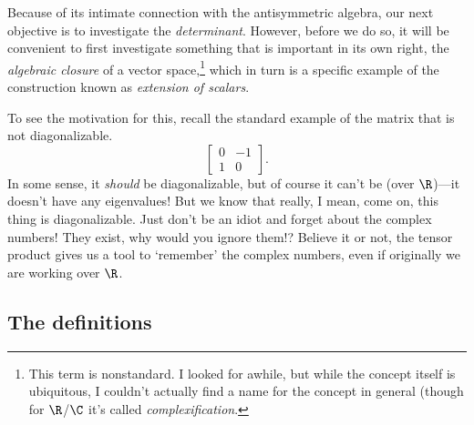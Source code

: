 Because of its intimate connection with the antisymmetric algebra, our next objective is to investigate the \emph{determinant}.  However, before we do so, it will be convenient to first investigate something that is important in its own right, the \emph{algebraic closure} of a vector space,\footnote{This term is nonstandard.  I looked for awhile, but while the concept itself is ubiquitous, I couldn't actually find a name for the concept in general (though for $\R$/$\C$ it's called \emph{complexification}.} which in turn is a specific example of the construction known as \emph{extension of scalars}.

To see the motivation for this, recall the standard example of the matrix that is not diagonalizable.
\begin{equation}
	\begin{bmatrix}0 & -1 \\ 1 & 0\end{bmatrix}.
\end{equation}
In some sense, it \emph{should} be diagonalizable, but of course it can't be (over $\R$)---it doesn't have any eigenvalues!  But we know that really, I mean, come on, this thing is diagonalizable.  Just don't be an idiot and forget about the complex numbers!  They exist, why would you ignore them!?  Believe it or not, the tensor product gives us a tool to `remember' the complex numbers, even if originally we are working over $\R$.

\subsection{The definitions}

